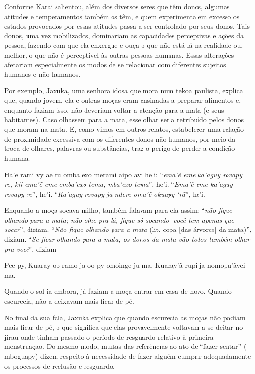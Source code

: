 Conforme Karai salientou, além dos diversos seres que têm donos, algumas
atitudes e temperamentos também os têm, e quem experimenta em excesso
os estados provocados por essas atitudes passa a ser controlado por
seus donos. Tais donos, uma vez mobilizados, dominariam as capacidades
perceptivas e ações da pessoa, fazendo com que ela enxergue e ouça o
que não está lá na realidade ou, melhor, o que não é perceptível às
outras pessoas humanas. Essas alterações afetariam especialmente os
modos de se relacionar com diferentes sujeitos humanos e não-humanos.

Por exemplo, Jaxuka, uma senhora idosa que mora num tekoa paulista,
explica que, quando jovem, ela e outras moças eram ensinadas a preparar
alimentos e, enquanto faziam isso, não deveriam voltar a atenção para a
mata (e seus habitantes). Caso olhassem para a mata, esse olhar seria
retribuído pelos donos que moram na mata. E, como vimos em outros
relatos, estabelecer uma relação de proximidade excessiva com os
diferentes donos não-humanos, por meio da troca de olhares, palavras ou
substâncias, traz o perigo de perder a condição humana.  

\bigskip

\begin{paracol}{2}
\footnotesize
\bigskip
Ha'e rami vy ae tu omba'exo merami aipo avi he'i: ``\emph{ema'ẽ eme
ka'aguy rovapy re, kii ema'ẽ eme emba'exo tema, mba'exo tema}'', he'i.
``\emph{Ema'ẽ eme ka'aguy rovapy re}'', he'i. ``\emph{Ka'aguy rovapy ja
ndere oma'ẽ okuapy `rã}'', he'i.

\switchcolumn
Enquanto a moça socava milho, também falavam para ela assim: ``\emph{não
fique olhando para a mata; não olhe pra lá, fique só socando, você tem
apenas que socar}'', diziam. ``\emph{Não fique olhando para a mata}
(lit. copa [das árvores] da mata)'', diziam. ``\emph{Se ficar
olhando para a mata, os donos da mata vão todos também olhar pra
você}'', diziam.

\switchcolumn
Pee py, Kuaray oo ramo ja oo py omoinge ju ma. Kuaray’ã rupi ja
nomopu’ãvei ma. 

\switchcolumn
Quando o sol ia embora, já faziam a moça entrar em casa de novo. Quando
escurecia, não a deixavam mais ficar de pé.
\end{paracol}

\bigskip

No final da sua fala, Jaxuka explica que quando escurecia as moças não
podiam mais ficar de pé, o que significa que elas provavelmente
voltavam a se deitar no jirau onde tinham passado o período de
resguardo relativo à primeira menstruação. Do mesmo modo, muitas das
referências ao ato de ``fazer sentar'' (-mboguapy) dizem respeito à
necessidade de fazer alguém cumprir adequadamente os processos de
reclusão e resguardo. 

